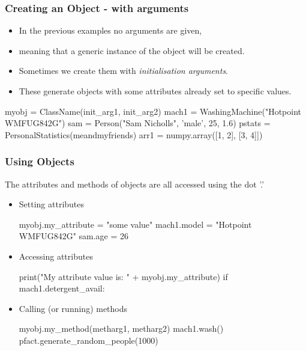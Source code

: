 \documentclass{beamer}
\begin{document}
\begin{frame}[fragile]
\frametitle{Creating an Object - with arguments}

\begin{itemize}
\item In the previous examples no arguments are given,
\item meaning that a generic instance of the object will be created.
\item Sometimes we create them with \emph{initialisation arguments}.
\item These generate objects with some attributes already set to specific values.
\end{itemize}

\begin{code}
myobj = ClassName(init_arg1, init_arg2)
mach1 = WashingMachine("Hotpoint WMFUG842G")
sam = Person("Sam Nicholls", 'male', 25, 1.6)
pstats = PersonalStatistics(meandmyfriends)
arr1 = numpy.array([1, 2], [3, 4]])
\end{code}
\end{frame}

\begin{frame}[fragile]
\frametitle{Using Objects}
The attributes and methods of objects are all accessed using the dot '.'
\begin{itemize}
\item Setting attributes
\begin{code}
myobj.my_attribute = "some value"
mach1.model = "Hotpoint WMFUG842G"
sam.age = 26
\end{code}
\item Accessing attributes
\begin{code}
print("My attribute value is: " + myobj.my_attribute)
if mach1.detergent_avail:
\end{code}
\item Calling (or running) methods
\begin{code}
myobj.my_method(metharg1, metharg2)
mach1.wash()
pfact.generate_random_people(1000)
\end{code}
\end{itemize}
\end{frame}
\end{document}
